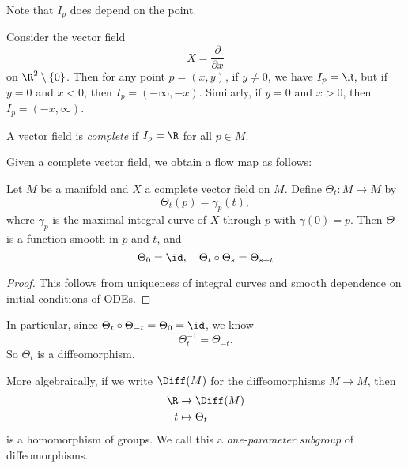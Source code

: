 \documentclass[a4paper]{article}
\begin{document}
Note that $I_p$ does depend on the point.

\begin{eg}
  Consider the vector field
  \[
    X = \frac{\partial}{\partial x}
  \]
  on $\R^2 \setminus \{0\}$. Then for any point $p = (x, y)$, if $y \not= 0$, we have $I_p = \R$, but if $y = 0$ and $x < 0$, then $I_p = (-\infty, -x)$. Similarly, if $y = 0$ and $x > 0$, then $I_p = (-x, \infty)$.
  \begin{center}
  \end{center}
\end{eg}

\begin{defi}
  A vector field is \emph{complete} if $I_p = \R$ for all $p \in M$.
\end{defi}

Given a complete vector field, we obtain a flow map as follows:
\begin{thm}
  Let $M$ be a manifold and $X$ a complete vector field on $M$. Define $\Theta_t: M \to M$ by
  \[
    \Theta_t(p) = \gamma_p(t),
  \]
  where $\gamma_p$ is the maximal integral curve of $X$ through $p$ with $\gamma(0) = p$. Then $\Theta$ is a function smooth in $p$ and $t$, and
  \[
    \Theta_0 = \id,\quad \Theta_t \circ \Theta_s = \Theta_{s + t}
  \]
\end{thm}

\begin{proof}
  This follows from uniqueness of integral curves and smooth dependence on initial conditions of ODEs.
\end{proof}

In particular, since $\Theta_t \circ \Theta_{-t} = \Theta_0 = \id$, we know
\[
  \Theta_t^{-1} = \Theta_{-t}.
\]
So $\Theta_t$ is a diffeomorphism.

More algebraically, if we write $\Diff(M)$ for the diffeomorphisms $M \to M$, then
\begin{align*}
  \R &\to \Diff(M)\\
  t &\mapsto \Theta_t
\end{align*}
is a homomorphism of groups. We call this a \emph{one-parameter subgroup} of diffeomorphisms.
\end{document}
